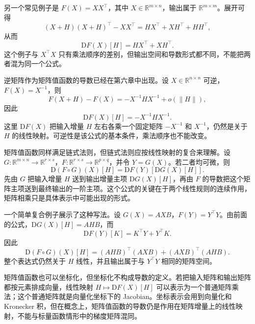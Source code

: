 另一个常见例子是 \(F(X)=XX^\top\)，其中 \(X\in\mathbb{R}^{m\times n}\)，输出属于 \(\mathbb{R}^{m\times m}\)。展开可得
\[
(X+H)(X+H)^\top-XX^\top=H X^\top+XH^\top+HH^\top,
\]
从而
\[
\mathrm{D}F(X)[H]=H X^\top+XH^\top.
\]
这个例子与 \(X^\top X\) 只有乘法顺序的差别，但输出空间和导数形式都不同，不能把两者混为同一个公式。

逆矩阵作为矩阵值函数的导数已经在第六章中出现。设 \(X\in\mathbb{R}^{n\times n}\) 可逆，\(F(X)=X^{-1}\)，则
\[
F(X+H)-F(X)=-X^{-1}H X^{-1}+o(\|H\|),
\]
因此
\[
\mathrm{D}F(X)[H]=-X^{-1}H X^{-1}.
\]
这里 \(\mathrm{D}F(X)\) 把输入增量 \(H\) 左右各乘一个固定矩阵 \(-X^{-1}\) 和 \(X^{-1}\)，仍然是关于 \(H\) 的线性映射。可逆性是该公式的基本条件，乘法顺序也不能改变。

矩阵值函数同样满足链式法则，但链式法则应按线性映射的复合来理解。设 \(G:\mathbb{R}^{m\times n}\to\mathbb{R}^{r\times s}\)，\(F:\mathbb{R}^{r\times s}\to\mathbb{R}^{p\times q}\)，并令 \(Y=G(X)\)。若二者均可微，则
\[
\mathrm{D}(F\circ G)(X)[H]=\mathrm{D}F(Y)[\mathrm{D}G(X)[H]].
\]
先由 \(G\) 把输入增量 \(H\) 送到输出增量主项 \(\mathrm{D}G(X)[H]\)，再由 \(F\) 的导数把这个矩阵主项送到最终输出的一阶主项。这个公式的关键在于两个线性规则的连续作用，矩阵相乘只是具体表示中可能出现的形式。

一个简单复合例子展示了这种写法。设 \(G(X)=AXB\)，\(F(Y)=Y^\top Y\)。由前面的公式，\(\mathrm{D}G(X)[H]=AHB\)，而
\[
\mathrm{D}F(Y)[K]=K^\top Y+Y^\top K.
\]
因此
\[
\mathrm{D}(F\circ G)(X)[H]=(AHB)^\top(AXB)+(AXB)^\top(AHB).
\]
整个表达式仍然关于 \(H\) 线性，并且输出属于与 \(Y^\top Y\) 相同的矩阵空间。

矩阵值函数也可以坐标化，但坐标化不构成导数的定义。若把输入矩阵和输出矩阵都按元素排成向量，线性映射 \(H\mapsto \mathrm{D}F(X)[H]\) 可以表示为一个普通矩阵乘法；这个普通矩阵就是向量化坐标下的 Jacobian。坐标表示会用到向量化和 Kronecker 积，但在概念上，矩阵值函数的导数仍是作用在矩阵增量上的线性映射，不能与标量函数情形中的梯度矩阵混同。
